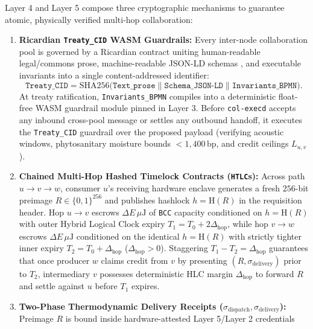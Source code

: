 Layer 4 and Layer 5 compose three cryptographic mechanisms to guarantee atomic, physically
verified multi-hop collaboration:

\begin{enumerate}
    \item \textbf{Ricardian \texttt{Treaty\_CID} WASM Guardrails:} Every inter-node
    collaboration pool is governed by a Ricardian contract \parencite{grigg2004} uniting
    human-readable legal/commons prose, machine-readable JSON-LD schemas
    \parencite{w3c2020jsonld}, and executable invariants into a single content-addressed
    identifier:
    \begin{equation}
    \label{eq:treaty-cid}
    \texttt{Treaty\_CID} = \mathrm{SHA256}\bigl(\texttt{Text\_prose} \parallel \texttt{Schema\_JSON-LD} \parallel \texttt{Invariants\_BPMN}\bigr).
    \end{equation}
    At treaty ratification, \texttt{Invariants\_BPMN} compiles into a deterministic float-free
    WASM guardrail module pinned in Layer 3. Before \texttt{col-execd} accepts any inbound
    cross-pool message or settles any outbound handoff, it executes the \texttt{Treaty\_CID}
    guardrail over the proposed payload (verifying acoustic windows, phytosanitary moisture
    bounds $< 1{,}400\,\mathrm{bp}$, and credit ceilings $L_{u,v}$).
    \item \textbf{Chained Multi-Hop Hashed Timelock Contracts (\texttt{HTLC}s):} Across path
    $u \to v \to w$, consumer $u$'s receiving hardware enclave generates a fresh $256$-bit
    preimage $R \in \{0,1\}^{256}$ and publishes hashlock $h = \mathrm{H}(R)$ in the
    requisition header. Hop $u \to v$ escrows $\Delta E\,\mu\mathrm{J}$ of \texttt{BCC}
    capacity conditioned on $h = \mathrm{H}(R)$ with outer Hybrid Logical Clock expiry
    $T_1 = T_0 + 2\Delta_{\mathrm{hop}}$, while hop $v \to w$ escrows $\Delta E\,\mu\mathrm{J}$
    conditioned on the identical $h = \mathrm{H}(R)$ with strictly tighter inner expiry
    $T_2 = T_0 + \Delta_{\mathrm{hop}}$ ($\Delta_{\mathrm{hop}} > 0$). Staggering
    $T_1 - T_2 = \Delta_{\mathrm{hop}}$ guarantees that once producer $w$ claims credit from
    $v$ by presenting $(R, \sigma_{\mathrm{delivery}})$ prior to $T_2$, intermediary $v$
    possesses deterministic HLC margin $\Delta_{\mathrm{hop}}$ to forward $R$ and settle
    against $u$ before $T_1$ expires.
    \item \textbf{Two-Phase Thermodynamic Delivery Receipts ($\sigma_{\mathrm{dispatch}},
        \sigma_{\mathrm{delivery}}$):}
    Preimage $R$ is bound inside hardware-attested Layer 5/Layer 2 credentials

\end{enumerate}
